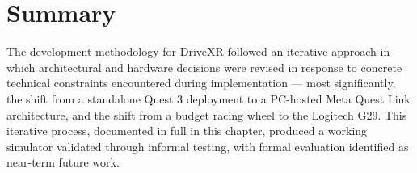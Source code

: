 \section{Summary}
The development methodology for DriveXR followed an iterative approach in which architectural and hardware decisions were revised in response to concrete technical constraints encountered during implementation — most significantly, the shift from a standalone Quest 3 deployment to a PC-hosted Meta Quest Link architecture, and the shift from a budget racing wheel to the Logitech G29. This iterative process, documented in full in this chapter, produced a working simulator validated through informal testing, with formal evaluation identified as near-term future work.